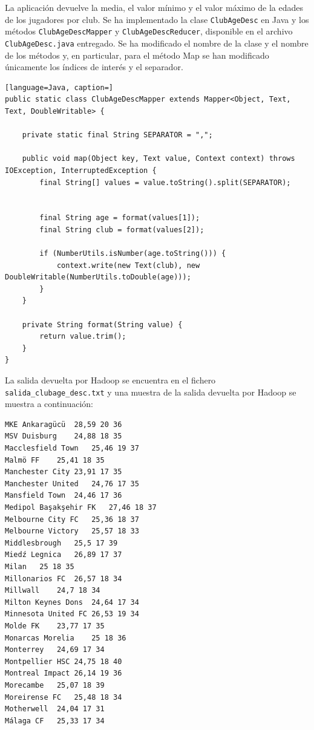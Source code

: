 \documentclass[10pt,swedish, openany]{book}
\begin{document}
La aplicación devuelve la media, el valor mínimo y el valor máximo de la edades de los jugadores por club. Se ha implementado la clase \texttt{ClubAgeDesc} en Java y los métodos \texttt{ClubAgeDescMapper} y \texttt{ClubAgeDescReducer}, disponible en el archivo \texttt{ClubAgeDesc.java} entregado. 
Se ha modificado el nombre de la clase y el nombre de los métodos y, en particular, para el método Map se han modificado únicamente los índices de interés y el separador.
\begin{lstlisting}[language=Java, caption=]
public static class ClubAgeDescMapper extends Mapper<Object, Text, Text, DoubleWritable> {

    private static final String SEPARATOR = ",";
    
    public void map(Object key, Text value, Context context) throws IOException, InterruptedException {
    	final String[] values = value.toString().split(SEPARATOR);
    
    	
    	final String age = format(values[1]);
    	final String club = format(values[2]);
    
    	if (NumberUtils.isNumber(age.toString())) {
    		context.write(new Text(club), new DoubleWritable(NumberUtils.toDouble(age)));
    	}
    }
    
    private String format(String value) {
    	return value.trim();
    }
}
\end{lstlisting}

La salida devuelta por Hadoop se encuentra en el fichero \texttt{salida\_clubage\_desc.txt} y una muestra de la salida devuelta por Hadoop se muestra a continuación:
\begin{verbatim}
MKE Ankaragücü	28,59 20 36
MSV Duisburg	24,88 18 35
Macclesfield Town	25,46 19 37
Malmö FF	25,41 18 35
Manchester City	23,91 17 35
Manchester United	24,76 17 35
Mansfield Town	24,46 17 36
Medipol Başakşehir FK	27,46 18 37
Melbourne City FC	25,36 18 37
Melbourne Victory	25,57 18 33
Middlesbrough	25,5 17 39
Miedź Legnica	26,89 17 37
Milan	25 18 35
Millonarios FC	26,57 18 34
Millwall	24,7 18 34
Milton Keynes Dons	24,64 17 34
Minnesota United FC	26,53 19 34
Molde FK	23,77 17 35
Monarcas Morelia	25 18 36
Monterrey	24,69 17 34
Montpellier HSC	24,75 18 40
Montreal Impact	26,14 19 36
Morecambe	25,07 18 39
Moreirense FC	25,48 18 34
Motherwell	24,04 17 31
Málaga CF	25,33 17 34
\end{verbatim}
\end{document}

